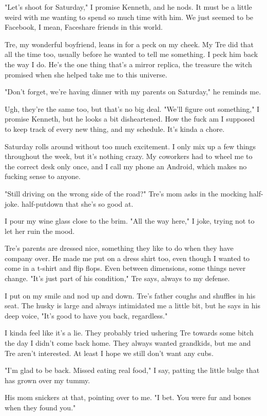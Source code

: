 "Let's shoot for Saturday," I promise Kenneth, and he nods. It must be a little weird with me wanting to spend so much time with him. We just seemed to be Facebook, I mean, Faceshare friends in this world.

Tre, my wonderful boyfriend, leans in for a peck on my cheek. My Tre did that all the time too, usually before he wanted to tell me something. I peck him back the way I do. He's the one thing that's a mirror replica, the treasure the witch promised when she helped take me to this universe.

"Don't forget, we're having dinner with my parents on Saturday," he reminds me.

Ugh, they're the same too, but that's no big deal. "We'll figure out something," I promise Kenneth, but he looks a bit disheartened. How the fuck am I supposed to keep track of every new thing, and my schedule. It's kinda a chore.

Saturday rolls around without too much excitement. I only mix up a few things throughout the week, but it's nothing crazy. My coworkers had to wheel me to the correct desk only once, and I call my phone an Android, which makes no fucking sense to anyone.

"Still driving on the wrong side of the road?" Tre's mom asks in the mocking half-joke. half-putdown that she's so good at.

I pour my wine glass close to the brim. "All the way here," I joke, trying not to let her ruin the mood.

Tre's parents are dressed nice, something they like to do when they have company over. He made me put on a dress shirt too, even though I wanted to come in a t-shirt and flip flops. Even between dimensions, some things never change. "It's just part of his condition," Tre says, always to my defense.

I put on my smile and nod up and down. Tre's father coughs and shuffles in his seat. The husky is large and always intimidated me a little bit, but he says in his deep voice, "It's good to have you back, regardless."

I kinda feel like it's a lie. They probably tried ushering Tre towards some bitch the day I didn't come back home. They always wanted grandkids, but me and Tre aren't interested. At least I hope we still don't want any cubs.

"I'm glad to be back. Missed eating real food," I say, patting the little bulge that has grown over my tummy.

His mom snickers at that, pointing over to me. "I bet. You were fur and bones when they found you."

